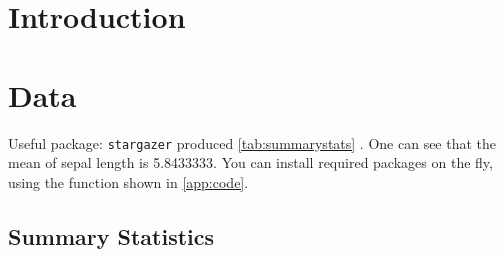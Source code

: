 \documentclass[a4paper,11pt,bibliography=totoc,numbers=noenddot]{scrartcl}\usepackage[]{graphicx}\usepackage[]{color}
\begin{document}






\newpage
\tableofcontents
\newpage
\listoftables
\newpage
\listoffigures



\newpage
{}
\section{Introduction}
\label{sec:Introduction}
\blindtext


\newpage
\section{Data}
\label{sec:Data}
\blindtext[1]

Useful package: \texttt{stargazer} produced \vref{tab:summarystats} \cite{stargazer}. One can see that the mean of sepal length is 5.8433333. You can install required packages on the fly, using the function shown in \vref{app:code}.
\subsection{Summary Statistics}
\label{sub:Stats}
\blindtext
\end{document}
